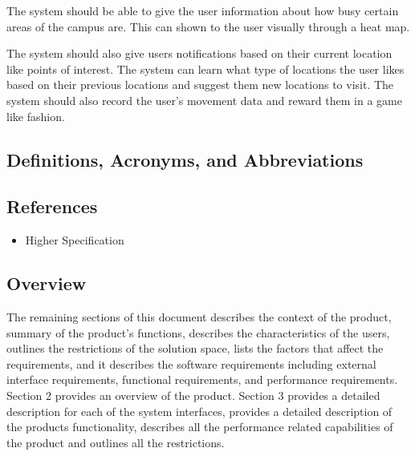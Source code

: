 \documentclass[11pt]{article}
\begin{document}
	The system should be able to give the user information about how busy certain areas of the campus are. This can shown to the user visually through a heat map.
	
	The system should also give users notifications based on their current location like points of interest. The system can learn what type of locations the user likes based on their previous locations and suggest them new locations to visit. The system should also record the user's movement data and reward them in a game like fashion. 
	
	\subsection{Definitions, Acronyms, and Abbreviations}
	\begin{table}[]
		\centering
	\end{table}

	\subsection{References}
	\begin{itemize}
		\item Higher Specification
	\end{itemize}

	\subsection{Overview}
	The remaining sections of this document describes the context of the product, summary of the product’s functions, describes the characteristics of the users, outlines the restrictions of the solution space, lists the factors that affect the requirements, and it describes the software requirements including external interface requirements, functional requirements,  and performance requirements. Section 2 provides an overview of the product. Section 3 provides a detailed description for each of the system interfaces, provides a detailed description of the products functionality, describes all the performance related capabilities of the product and outlines all the restrictions. 
\end{document}

